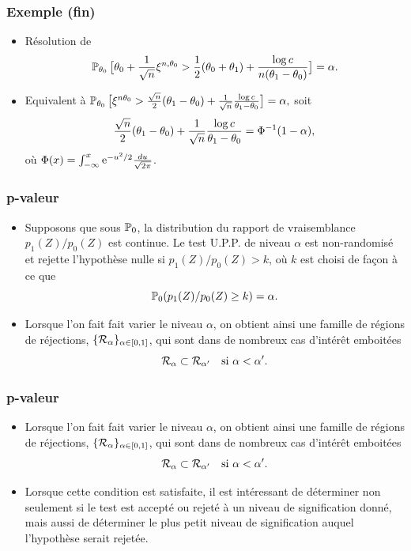 \begin{frame}
\frametitle{Exemple (fin)}
\begin{itemize}
\item \alert{Résolution de}
$$\operatorname{{\mathbb P}}_{\theta_0}\big[\theta_0 + \frac{1}{\sqrt{n}}\xi^{n,\theta_0} > \frac{1}{2}(\theta_0+\theta_1)+\frac{\log c}{n(\theta_1-\theta_0)}\big]=\alpha.$$
\item \alert{Equivalent à}
$\operatorname{{\mathbb P}}_{\theta_0}\big[\xi^{n\theta_0} > \frac{\sqrt{n}}{2}(\theta_1-\theta_0)+\frac{1}{\sqrt{n}}\frac{\log c}{\theta_1-\theta_0}\big]=\alpha,$
soit
$$\frac{\sqrt{n}}{2}(\theta_1-\theta_0)+\frac{1}{\sqrt{n}}\frac{\log c}{\theta_1-\theta_0}=\Phi^{-1}(1-\alpha),$$
où $\Phi(x) = \int_{-\infty}^x \mathrm{e}^{-u^2/2}\tfrac{du}{\sqrt{2\pi}}$.
\end{itemize}
\end{frame}


\begin{frame}
\frametitle{p-valeur}
\begin{itemize}
\item Supposons que sous $\operatorname{{\mathbb P}}_0$, la distribution du rapport de vraisemblance $p_1(Z)/p_0(Z)$ est continue. Le test U.P.P.
de niveau $\alpha$ est non-randomisé et rejette l'hypothèse nulle si $p_1(Z)/p_0(Z) > k$, où $k$ est choisi de façon à ce que
\[
\operatorname{{\mathbb P}}_0 ( p_1(Z)/ p_0(Z) \geq k) = \alpha.
\]
\item Lorsque l'on fait fait varier le niveau $\alpha$, on obtient ainsi une famille de régions de réjections, $\{\mathcal{R}_\alpha\}_{\alpha \in \left[0,1\right]}$, qui sont dans de nombreux cas d'intérêt emboitées
    $$
    \mathcal{R}_\alpha \subset \mathcal{R}_{\alpha'} \quad \text{si $\alpha < \alpha'$}.
    $$
\end{itemize}
\end{frame}


\begin{frame}
\frametitle{p-valeur}
\begin{itemize}
\item Lorsque l'on fait fait varier le niveau $\alpha$, on obtient ainsi une famille de régions de réjections, $\{\mathcal{R}_\alpha\}_{\alpha \in \left[0,1\right]}$, qui sont dans de nombreux cas d'intérêt emboitées
    $$
    \mathcal{R}_\alpha \subset \mathcal{R}_{\alpha'} \quad \text{si $\alpha < \alpha'$}.
    $$
\item Lorsque cette condition est satisfaite, il est intéressant de déterminer non seulement si le test est accepté ou rejeté à un niveau de signification donné, mais aussi de déterminer \alert{le plus petit niveau de signification} auquel l'hypothèse serait rejetée.
\end{itemize}
\end{frame}

